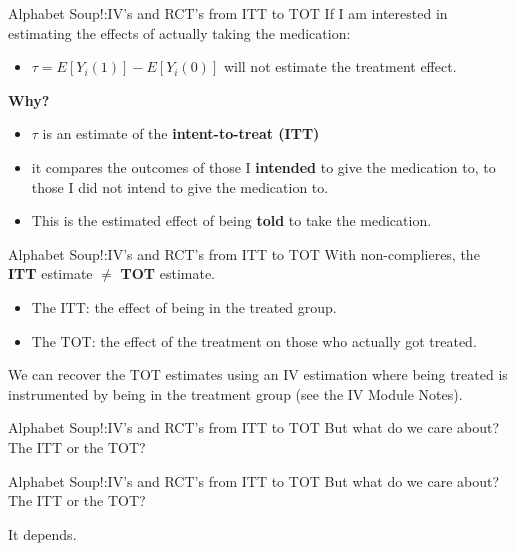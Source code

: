 \documentclass[
  ignorenonframetext,
]{beamer}
\providecommand{\tightlist}{%
  \setlength{\itemsep}{0pt}\setlength{\parskip}{0pt}}
\begin{document}
\begin{frame}{Alphabet Soup!:IV's and RCT's from ITT to TOT}
\protect\hypertarget{alphabet-soupivs-and-rcts-from-itt-to-tot-2}{}
If I am interested in estimating the effects of actually taking the
medication:

\begin{itemize}
\tightlist
\item
  \(\tau=E[Y_i(1)]-E[Y_i(0)]\) will not estimate the treatment effect.
\end{itemize}

\textbf{Why?}

\begin{itemize}
\item
  \(\tau\) is an estimate of the \textbf{intent-to-treat (ITT)}
\item
  it compares the outcomes of those I \textbf{intended} to give the
  medication to, to those I did not intend to give the medication to.
\item
  This is the estimated effect of being \textbf{told} to take the
  medication.
\end{itemize}
\end{frame}

\begin{frame}{Alphabet Soup!:IV's and RCT's from ITT to TOT}
\protect\hypertarget{alphabet-soupivs-and-rcts-from-itt-to-tot-3}{}
With non-complieres, the \textbf{ITT} estimate \(\neq\) \textbf{TOT}
estimate.

\begin{itemize}
\item
  The ITT: the effect of being in the treated group.
\item
  The TOT: the effect of the treatment on those who actually got
  treated.
\end{itemize}

We can recover the TOT estimates using an IV estimation where being
treated is instrumented by being in the treatment group (see the IV
Module Notes).
\end{frame}

\begin{frame}{Alphabet Soup!:IV's and RCT's from ITT to TOT}
\protect\hypertarget{alphabet-soupivs-and-rcts-from-itt-to-tot-4}{}
But what do we care about? The ITT or the TOT?
\end{frame}

\begin{frame}{Alphabet Soup!:IV's and RCT's from ITT to TOT}
\protect\hypertarget{alphabet-soupivs-and-rcts-from-itt-to-tot-5}{}
But what do we care about? The ITT or the TOT?

It depends.
\end{frame}
\end{document}
